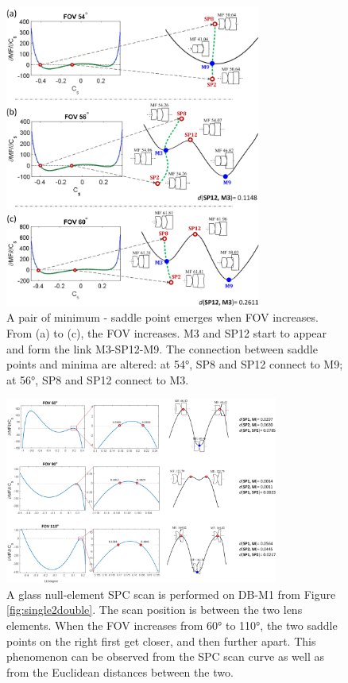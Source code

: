 \begin{figure}[h!]
    \centering
    \includegraphics[width=0.75\textwidth]{chapter-3/figures/SystemBorn.png}
    \caption{A pair of minimum - saddle point emerges when FOV increases. From (a) to (c), the FOV increases. M3 and SP12 start to appear and form the link M3-SP12-M9. The connection between saddle points and minima are altered: at 54°, SP8 and SP12 connect to M9; at 56°, SP8 and SP12 connect to M3.}
    \label{fig:systemborn}
\end{figure}

\begin{figure}[h!]
    \centering
    \includegraphics[width=0.8\textwidth]{chapter-3/figures/SystemReborn_vt.png}
    \caption{A glass null-element SPC scan is performed on DB-M1 from Figure \ref{fig:single2double}. The scan position is between the two lens elements. When the FOV increases from 60° to 110°, the two saddle points on the right first get closer, and then further apart. This phenomenon can be observed from the SPC scan curve as well as from the Euclidean distances between the two.}
    \label{fig:systemreborn}
\end{figure}

